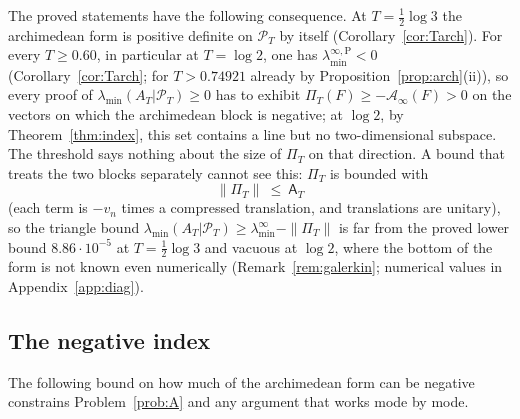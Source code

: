 \documentclass[11pt]{amsart}
\theoremstyle{definition}
\theoremstyle{remark}
\newcommand{\PT}{\mathcal P_T}
\newcommand{\lamA}{\lambda_{\min}(A_T|\PT)}
\newcommand{\Aconst}{\mathsf A_T}
\newcommand{\Ainf}{\mathcal A_\infty}
\newcommand{\PiT}{\Pi_T}
\newcommand{\laminf}{\lambda^{\infty}_{\min}}
\newcommand{\laminfP}{\lambda^{\infty,\mathrm P}_{\min}}
\begin{document}
The proved statements have the following consequence. At $T=\frac12\log3$ the archimedean form is
positive definite on $\PT$ by itself (Corollary~\ref{cor:Tarch}). For every $T\ge0.60$, in particular
at $T=\log2$, one has $\laminfP<0$ (Corollary~\ref{cor:Tarch}; for $T>0.74921$ already by
Proposition~\ref{prop:arch}(ii)), so every proof of $\lamA\ge0$ has to exhibit
$\PiT(F)\ge-\Ainf(F)>0$ on the vectors on which the archimedean block is negative; at $\log2$, by
Theorem~\ref{thm:index}, this set contains a line but no two-dimensional subspace. The threshold says
nothing about the size of $\PiT$ on that direction. A bound that treats the two blocks separately
cannot see this: $\PiT$ is bounded with
\[
\|\PiT\|\ \le\ \Aconst
\]
(each term is $-v_n$ times a compressed translation, and translations are unitary), so the triangle
bound $\lamA\ge\laminf-\|\PiT\|$ is far from the proved lower bound $8.86\cdot10^{-5}$ at
$T=\frac12\log3$ and vacuous at $\log2$, where the bottom of the form is not known even numerically
(Remark~\ref{rem:galerkin}; numerical values in Appendix~\ref{app:diag}).

\subsection{The negative index}\label{subsec:negindex}

The following bound on how much of the archimedean form can be negative constrains
Problem~\ref{prob:A} and any argument that works mode by mode.
\end{document}
